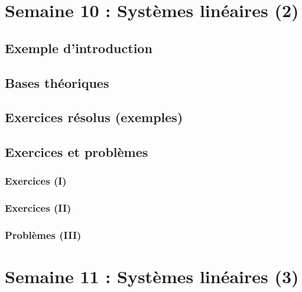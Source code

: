 \documentclass[
  12pt,
]{book}
\begin{document}
\hypertarget{semaine-10-systuxe8mes-linuxe9aires-2}{%
\chapter{Semaine 10 : Systèmes linéaires (2)}\label{semaine-10-systuxe8mes-linuxe9aires-2}}

\hypertarget{exemple-dintroduction-9}{%
\section{Exemple d'introduction}\label{exemple-dintroduction-9}}

\hypertarget{bases-thuxe9oriques-9}{%
\section{Bases théoriques}\label{bases-thuxe9oriques-9}}

\hypertarget{exercices-ruxe9solus-exemples-9}{%
\section{Exercices résolus (exemples)}\label{exercices-ruxe9solus-exemples-9}}

\hypertarget{exercices-et-probluxe8mes-9}{%
\section{Exercices et problèmes}\label{exercices-et-probluxe8mes-9}}

\hypertarget{exercices-i-9}{%
\subsection{Exercices (I)}\label{exercices-i-9}}

\hypertarget{exercices-ii-9}{%
\subsection{Exercices (II)}\label{exercices-ii-9}}

\hypertarget{probluxe8mes-iii-9}{%
\subsection{Problèmes (III)}\label{probluxe8mes-iii-9}}

\hypertarget{semaine-11-systuxe8mes-linuxe9aires-3}{%
\chapter{Semaine 11 : Systèmes linéaires (3)}\label{semaine-11-systuxe8mes-linuxe9aires-3}}
\end{document}

